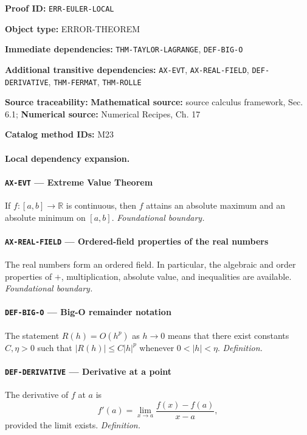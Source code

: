 \documentclass[10pt]{article}
\newcommand{\pidraw}[1]{\begingroup\urlstyle{tt}\nolinkurl{#1}\endgroup}
\theoremstyle{definition}
\theoremstyle{remark}
\newcommand{\meta}[2]{\noindent\textbf{#1:} #2\par}
\begin{document}
\meta{Proof ID}{\pidraw{ERR-EULER-LOCAL}}
\meta{Object type}{ERROR-THEOREM}
\meta{Immediate dependencies}{\pidraw{THM-TAYLOR-LAGRANGE}, \pidraw{DEF-BIG-O}}
\meta{Additional transitive dependencies}{\pidraw{AX-EVT}, \pidraw{AX-REAL-FIELD}, \pidraw{DEF-DERIVATIVE}, \pidraw{THM-FERMAT}, \pidraw{THM-ROLLE}}
\meta{Source traceability}{\textbf{Mathematical source:} source calculus framework, Sec. 6.1; \textbf{Numerical source:} Numerical Recipes, Ch. 17}
\meta{Catalog method IDs}{M23}

\paragraph{Local dependency expansion.}

\paragraph{\pidraw{AX-EVT} --- Extreme Value Theorem}
If $f:[a,b]\to\mathbb{R}$ is continuous, then $f$ attains an absolute maximum and an absolute minimum on $[a,b]$.
\textit{Foundational boundary.}

\paragraph{\pidraw{AX-REAL-FIELD} --- Ordered-field properties of the real numbers}
The real numbers form an ordered field. In particular, the algebraic and order properties of $+$, multiplication, absolute value, and inequalities are available.
\textit{Foundational boundary.}

\paragraph{\pidraw{DEF-BIG-O} --- Big-O remainder notation}
The statement $R(h)=O(h^p)$ as $h\to0$ means that there exist constants $C,\eta>0$ such that $|R(h)|\le C|h|^p$ whenever $0<|h|<\eta$.
\textit{Definition.}

\paragraph{\pidraw{DEF-DERIVATIVE} --- Derivative at a point}
The derivative of $f$ at $a$ is
\[
f'(a)=\lim_{x\to a}\frac{f(x)-f(a)}{x-a},
\]
provided the limit exists.
\textit{Definition.}
\end{document}
